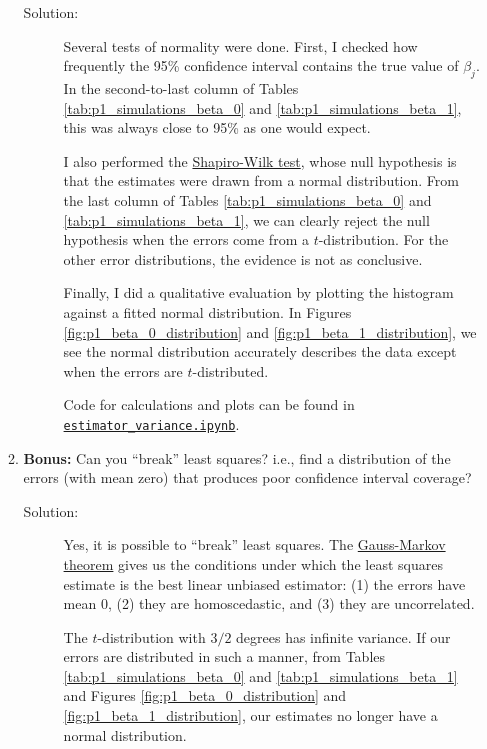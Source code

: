 \documentclass[letterpaper,11pt]{article}
\begin{document}
\begin{enumerate}
\begin{enumerate}
    \begin{description}
    \item[Solution:] Several tests of normality were done. First, I checked how
      frequently the 95\% confidence interval contains the true value of
      $\beta_j$. In the second-to-last column of Tables
      \ref{tab:p1_simulations_beta_0} and \ref{tab:p1_simulations_beta_1}, this
      was always close to 95\% as one would expect.

      I also performed the
      \href{https://en.wikipedia.org/wiki/Shapiro\%E2\%80\%93Wilk\_test}{Shapiro-Wilk
        test}, whose null hypothesis is that the estimates were drawn from a
      normal distribution. From the last column of Tables
      \ref{tab:p1_simulations_beta_0} and \ref{tab:p1_simulations_beta_1}, we
      can clearly reject the null hypothesis when the errors come from a
      $t$-distribution. For the other error distributions, the evidence is not
      as conclusive.

      Finally, I did a qualitative evaluation by plotting the histogram against
      a fitted normal distribution. In Figures \ref{fig:p1_beta_0_distribution}
      and \ref{fig:p1_beta_1_distribution}, we see the normal distribution
      accurately describes the data except when the errors are $t$-distributed.
      
      Code for calculations and plots can be found in
      \href{https://nbviewer.jupyter.org/github/ppham27/stat570/blob/master/hw2/estimator\_variance.ipynb}{\texttt{estimator\_variance.ipynb}}.
    \end{description}
    
  \item \textbf{Bonus:} Can you ``break'' least squares? i.e., find a
    distribution of the errors (with mean zero) that produces poor confidence
    interval coverage?
    
    \begin{description}
    \item[Solution:] Yes, it is possible to ``break'' least squares. The
      \href{https://en.wikipedia.org/wiki/Gauss\%E2\%80\%93Markov\_theorem}{Gauss-Markov
        theorem} gives us the conditions under which the least squares estimate
      is the best linear unbiased estimator: (1) the errors have mean 0, (2)
      they are homoscedastic, and (3) they are uncorrelated.

      The $t$-distribution with $3/2$ degrees has infinite variance. If our
      errors are distributed in such a manner, from Tables
      \ref{tab:p1_simulations_beta_0} and \ref{tab:p1_simulations_beta_1} and
      Figures \ref{fig:p1_beta_0_distribution} and
      \ref{fig:p1_beta_1_distribution}, our estimates no longer have a normal
      distribution.


\end{description}
\end{enumerate}
\end{enumerate}
\end{document}
